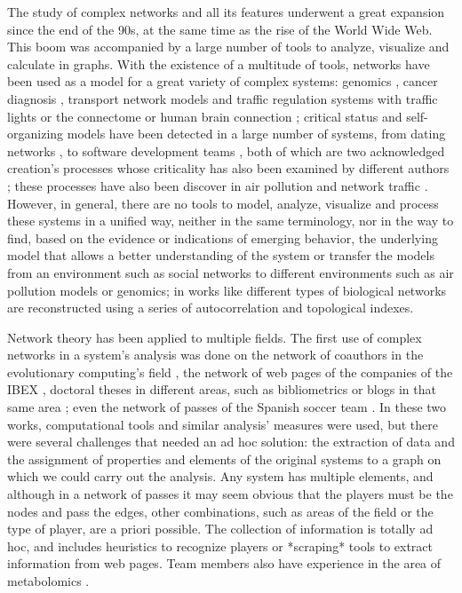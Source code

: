 \documentclass[runningheads,a4paper]{llncs}
\begin{document}
The study of complex networks and all its features underwent a great
expansion since the end of the 90s, at the same time as the rise of
the World Wide Web. This boom was accompanied by a large number of
tools to analyze, visualize and calculate in graphs. With the
existence of a multitude of tools, networks have been used as a model
for a great variety of complex systems: genomics \cite{park2015deep},
cancer diagnosis \cite{roullier2010graph}, transport network models
\cite{ma2015} and traffic regulation systems with traffic lights
\cite{goel2017} or the connectome or human brain connection 
\cite{sporns2005human}; critical status and self-organizing models have
been detected in a large number of systems, from dating networks
\cite{leydesdorff2018discontinuities,benjafield2017between}, to software
development teams \cite{gorshenev2004punctuated}, both of which are two
acknowledged creation's processes whose criticality has also been
examined by different authors \cite{tadic2017mechanisms}; these processes
have also been discover in air pollution \cite{shi2009self} and network
traffic \cite{nagel1996network}. However, in general, there are no tools
to model, analyze, visualize and process these systems in a unified
way, neither in the same terminology, nor in the way to find, based on
the evidence or indications of emerging behavior, the underlying model
that allows a better understanding of the system or transfer the
models from an environment such as social networks to different
environments such as air pollution models or genomics; in works like
\cite{gd2012} different types of biological networks are reconstructed
using a series of autocorrelation and topological indexes. 



Network theory has been applied to multiple fields. The first use of
complex networks in a system's  analysis was done on the network of
coauthors in the evolutionary computing's field \cite{redes-arxiv,ec-network-2006,merelo2007bce}, the network of web pages of the
companies of the IBEX \cite{ibex2015}, doctoral theses in different areas,
such as bibliometrics or blogs in that same area
\cite{TORRESSALINAS2011168}; even the network of passes of the Spanish
soccer team \cite{futbol2005,futbol2011}. In these two works,
computational tools and similar analysis' measures were used, but
there were several challenges that needed an ad hoc solution: the
extraction of data and the assignment of properties and elements of
the original systems to a graph on which we could carry out the
analysis. Any system has multiple elements, and although in a network
of passes it may seem obvious that the players must be the nodes and
pass the edges, other combinations, such as areas of the field or the
type of player, are a priori possible. The collection of information
is totally ad hoc, and includes heuristics to recognize players or
*scraping* tools to extract information from web pages. Team members
also have experience in the area of metabolomics \cite{granados2017p1}. 
\end{document}
